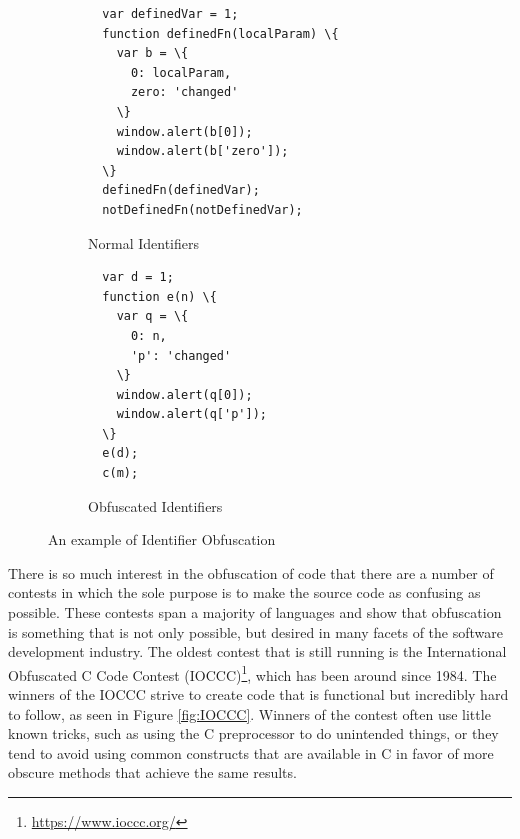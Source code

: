 \begin{figure}
\begin{tcolorbox}
\centering
\begin{subfigure}{.5\textwidth}
  \centering
  \begin{Verbatim}
  var definedVar = 1;
  function definedFn(localParam) \{
    var b = \{
      0: localParam,
      zero: 'changed'
    \}
    window.alert(b[0]);
    window.alert(b['zero']);
  \}
  definedFn(definedVar);
  notDefinedFn(notDefinedVar);
  \end{Verbatim}
  \caption{Normal Identifiers}
  \label{fig:sub1}
\end{subfigure}%
\begin{subfigure}{.5\textwidth}
  \centering
  \begin{Verbatim}
  var d = 1;
  function e(n) \{
    var q = \{
      0: n,
      'p': 'changed'
    \}
    window.alert(q[0]);
    window.alert(q['p']);
  \}
  e(d);
  c(m);
  \end{Verbatim}
  \caption{Obfuscated Identifiers}
  \label{fig:sub2}
\end{subfigure}
\end{tcolorbox}
\caption{An example of Identifier Obfuscation}
\label{fig:test}
\end{figure}
There is so much interest in the obfuscation of code that there are a number of contests in which the
sole purpose is to make the source code as confusing as possible. These contests span a majority of
languages and show that obfuscation is something that is not only possible, but desired in many facets
of the software development industry. The oldest contest that is still running is the International
Obfuscated C Code Contest (IOCCC)\footnote{\url{https://www.ioccc.org/}}, which has been around since 1984. The winners of the IOCCC strive to
create code that is functional but incredibly hard to follow, as seen in Figure \ref{fig:IOCCC}. Winners of
the contest often use little known tricks, such as using the C preprocessor to do unintended things, or
they tend to avoid using common constructs that are available in C in favor of more obscure methods 
that achieve the same results.  


